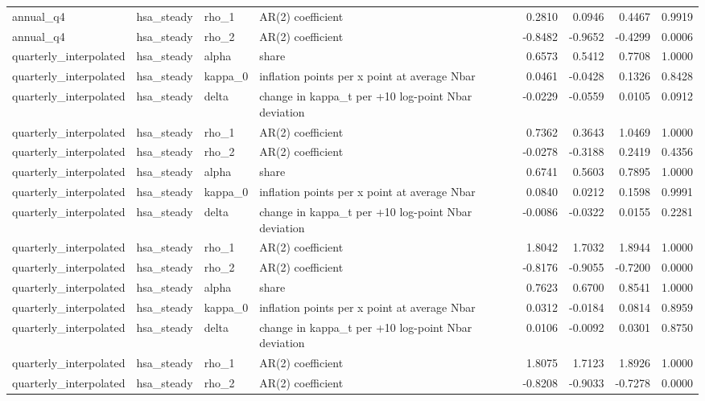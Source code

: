 \begin{tabular}{llllrrrr}
annual\_q4 & hsa\_steady & rho\_1 & AR(2) coefficient & 0.2810 & 0.0946 & 0.4467 & 0.9919 \\
annual\_q4 & hsa\_steady & rho\_2 & AR(2) coefficient & -0.8482 & -0.9652 & -0.4299 & 0.0006 \\
quarterly\_interpolated & hsa\_steady & alpha & share & 0.6573 & 0.5412 & 0.7708 & 1.0000 \\
quarterly\_interpolated & hsa\_steady & kappa\_0 & inflation points per x point at average Nbar & 0.0461 & -0.0428 & 0.1326 & 0.8428 \\
quarterly\_interpolated & hsa\_steady & delta & change in kappa\_t per +10 log-point Nbar deviation & -0.0229 & -0.0559 & 0.0105 & 0.0912 \\
quarterly\_interpolated & hsa\_steady & rho\_1 & AR(2) coefficient & 0.7362 & 0.3643 & 1.0469 & 1.0000 \\
quarterly\_interpolated & hsa\_steady & rho\_2 & AR(2) coefficient & -0.0278 & -0.3188 & 0.2419 & 0.4356 \\
quarterly\_interpolated & hsa\_steady & alpha & share & 0.6741 & 0.5603 & 0.7895 & 1.0000 \\
quarterly\_interpolated & hsa\_steady & kappa\_0 & inflation points per x point at average Nbar & 0.0840 & 0.0212 & 0.1598 & 0.9991 \\
quarterly\_interpolated & hsa\_steady & delta & change in kappa\_t per +10 log-point Nbar deviation & -0.0086 & -0.0322 & 0.0155 & 0.2281 \\
quarterly\_interpolated & hsa\_steady & rho\_1 & AR(2) coefficient & 1.8042 & 1.7032 & 1.8944 & 1.0000 \\
quarterly\_interpolated & hsa\_steady & rho\_2 & AR(2) coefficient & -0.8176 & -0.9055 & -0.7200 & 0.0000 \\
quarterly\_interpolated & hsa\_steady & alpha & share & 0.7623 & 0.6700 & 0.8541 & 1.0000 \\
quarterly\_interpolated & hsa\_steady & kappa\_0 & inflation points per x point at average Nbar & 0.0312 & -0.0184 & 0.0814 & 0.8959 \\
quarterly\_interpolated & hsa\_steady & delta & change in kappa\_t per +10 log-point Nbar deviation & 0.0106 & -0.0092 & 0.0301 & 0.8750 \\
quarterly\_interpolated & hsa\_steady & rho\_1 & AR(2) coefficient & 1.8075 & 1.7123 & 1.8926 & 1.0000 \\
quarterly\_interpolated & hsa\_steady & rho\_2 & AR(2) coefficient & -0.8208 & -0.9033 & -0.7278 & 0.0000 \\

\end{tabular}
